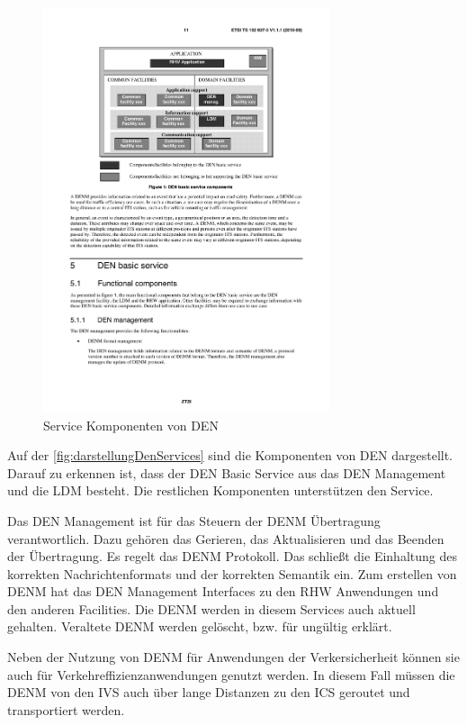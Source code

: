 \begin{figure}[htbp]
	\includegraphics[width=0.75\textwidth]{content/images/04_facilitylayer/denServices.pdf}
	\caption{Service Komponenten von DEN \cite{ts102637-3}}
	\label{fig:darstellungDenServices}
\end{figure}

Auf der \autoref{fig:darstellungDenServices} sind die Komponenten von \ac{DEN} dargestellt. Darauf zu erkennen ist, dass der \ac{DEN} Basic Service aus das \ac{DEN} Management und die \ac{LDM} besteht. Die restlichen Komponenten unterstützen den Service. 

Das \ac{DEN} Management  ist für das Steuern der \ac{DENM} Übertragung verantwortlich. Dazu gehören das Gerieren, das Aktualisieren und das Beenden der Übertragung. Es regelt das \ac{DENM} Protokoll. Das schließt die Einhaltung des korrekten Nachrichtenformats und der korrekten Semantik ein. Zum erstellen von \ac{DENM} hat das \ac{DEN} Management Interfaces zu den \ac{RHW} Anwendungen und den anderen Facilities. Die \ac{DENM} werden in diesem Services auch aktuell gehalten. Veraltete \ac{DENM} werden gelöscht, bzw. für ungültig erklärt. 





Neben der Nutzung von \ac{DENM} für Anwendungen der Verkersicherheit können sie auch für Verkehreffizienzanwendungen genutzt werden. In diesem Fall müssen die \ac{DENM} von den \ac{IVS} auch über lange Distanzen zu den \ac{ICS} geroutet und transportiert werden.



